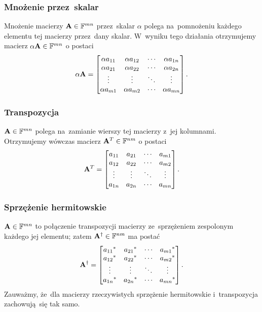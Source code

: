 \subsubsection{Mnożenie przez~skalar}
Mnożenie macierzy $\mathbf{A} \in \mathbb{F}^{mn}$ przez~skalar $\alpha$ polega
na~pomnożeniu każdego elementu tej macierzy przez~dany skalar. W~wyniku tego
działania otrzymujemy macierz $\alpha\mathbf{A} \in \mathbb{F}^{mn}$ o postaci
$$
	\alpha \mathbf{A} =
	\begin{bmatrix}
		\alpha a_{11} & \alpha a_{12} & \cdots & \alpha a_{1n} \\
		\alpha a_{21} & \alpha a_{22} & \cdots & \alpha a_{2n} \\
		\vdots        & \vdots        & \ddots & \vdots        \\
		\alpha a_{m1} & \alpha a_{m2} & \cdots & \alpha a_{mn}
	\end{bmatrix}.
$$

\subsubsection{Transpozycja}
 $\mathbf{A} \in
	\mathbb{F}^{mn}$ polega na~zamianie wierszy tej
macierzy z~jej kolumnami. Otrzymujemy wówczas macierz $\mathbf{A}^T \in
	\mathbb{F}^{nm}$ o postaci
$$\mathbf{A}^T =
	\begin{bmatrix}
		a_{11} & a_{21} & \cdots & a_{m1} \\
		a_{12} & a_{22} & \cdots & a_{m2} \\
		\vdots & \vdots & \ddots & \vdots \\
		a_{1n} & a_{2n} & \cdots & a_{mn}
	\end{bmatrix}.
$$


\subsubsection{Sprzężenie hermitowskie}
 $\mathbf{A} \in \mathbb{F}^{mn}$ to połączenie
transpozycji macierzy ze~sprzężeniem zespolonym każdego jej elementu; zatem
$\mathbf{A}^\dagger \in \mathbb{F}^{nm}$ ma postać
$$
	\mathbf{A}^\dagger =
	\begin{bmatrix}
		{a_{11}}^* & {a_{21}}^* & \cdots & {a_{m1}}^* \\
		{a_{12}}^* & {a_{22}}^* & \cdots & {a_{m2}}^* \\
		\vdots        & \vdots        & \ddots & \vdots        \\
		{a_{1n}}^* & {a_{2n}}^* & \cdots & {a_{mn}}^*
	\end{bmatrix}.
$$
Zauważmy, że~dla macierzy rzeczywistych sprzężenie hermitowskie i~transpozycja zachowują~się tak samo.

